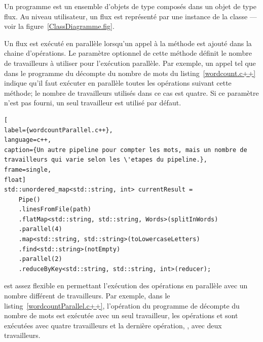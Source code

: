 Un programme \PpFf{} est un ensemble d'objets de type  compos\'es dans un objet de type flux. Au niveau utilisateur, un flux est repr\'esent\'e par une instance de la classe  --- voir la figure~\ref{ClassDiagramme.fig}. 


Un flux est ex\'ecut\'e en parall\`ele lorsqu'un appel \`a la m\'ethode  est ajout\'e dans la chaine d'op\'erations. Le param\`etre optionnel de cette m\'ethode d\'efinit le nombre de travailleurs \`a utiliser pour l'ex\'ecution parall\`ele. Par exemple, un appel tel que  dans le programme du d\'ecompte du nombre de mots du listing~\ref{wordcount.c++} indique qu'il faut ex\'ecuter en parall\`ele toutes les op\'erations suivant cette m\'ethode;  le nombre de travailleurs utilis\'es dans ce cas est quatre. Si ce param\`etre n'est pas fourni,  un seul travailleur est utilis\'e par d\'efaut. 


\begin{lstlisting}[
label={wordcountParallel.c++},
language=c++,
caption={Un autre pipeline pour compter les mots, mais un nombre de travailleurs qui varie selon les \'etapes du pipeline.},
frame=single,
float]
std::unordered_map<std::string, int> currentResult = 
	Pipe()
	.linesFromFile(path) 
	.flatMap<std::string, std::string, Words>(splitInWords)
	.parallel(4)
	.map<std::string, std::string>(toLowercaseLetters)
	.find<std::string>(notEmpty)
	.parallel(2)
	.reduceByKey<std::string, std::string, int>(reducer);
\end{lstlisting}




\PpFf{} est assez flexible en permettant l'ex\'ecution des op\'erations en parall\`ele avec un nombre diff\'erent de travailleurs. Par exemple, dans le listing~\ref{wordcountParallel.c++}, l’opération  du programme de d\'ecompte du nombre de mots est exécutée avec un seul travailleur, les opérations  et  sont exécutées avec quatre travailleurs et la dernière opération, , avec deux travailleurs. 






